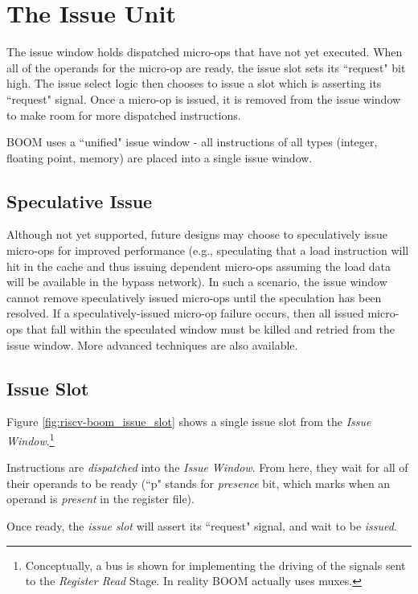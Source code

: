 \chapter{The Issue Unit}\label{chapter:issue}

The issue window holds dispatched micro-ops that have not yet executed.  When all of the operands for the micro-op are ready, the issue slot sets its ``request" bit high.  The issue select logic then chooses to issue a slot which is asserting its ``request" signal.  Once a micro-op is issued, it is removed from the issue window to make room for more dispatched instructions. 

BOOM uses a ``unified" issue window - all instructions of all types (integer, floating point, memory) are placed into a single issue window. 

\section{Speculative Issue}

Although not yet supported, future designs may choose to speculatively issue micro-ops for improved performance (e.g., speculating that a load instruction will hit in the cache and thus issuing dependent micro-ops assuming the load data will be available in the bypass network). In such a scenario, the issue window cannot remove speculatively issued micro-ops until the speculation has been resolved. If a speculatively-issued micro-op failure occurs, then all issued micro-ops that fall within the speculated window must be killed and retried from the issue window. More advanced techniques are also available.

\section{Issue Slot}

Figure \ref{fig:riscv-boom_issue_slot} shows a single issue slot from the {\em Issue Window}.\footnote{Conceptually, a bus is shown for implementing the driving of the signals sent to the {\em Register Read} Stage.  In reality BOOM actually uses muxes.}

Instructions are {\em dispatched} into the {\em Issue Window}.  From here, they wait for all of their operands to be ready (``p" stands for {\em presence} bit, which marks when an operand is {\em present} in the register file).  

Once ready, the {\em issue slot} will assert its ``request" signal, and wait to be {\em issued}.  

